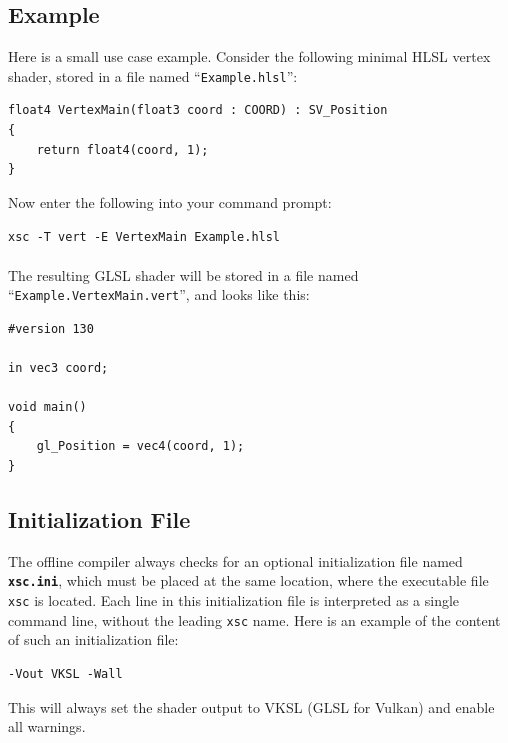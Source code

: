 \documentclass{article}
\begin{document}
\subsection{Example}

Here is a small use case example. Consider the following minimal HLSL vertex shader,
stored in a file named ``\texttt{Example.hlsl}'':
\begin{lstlisting}
float4 VertexMain(float3 coord : COORD) : SV_Position
{
    return float4(coord, 1);
}
\end{lstlisting}
Now enter the following into your command prompt:

\texttt{xsc -T vert -E VertexMain Example.hlsl}
\\ \\
\noindent
The resulting GLSL shader will be stored in a file named ``\texttt{Example.VertexMain.vert}'', and looks like this:
\begin{lstlisting}
#version 130

in vec3 coord;

void main()
{
    gl_Position = vec4(coord, 1);
}
\end{lstlisting}

\subsection{Initialization File}

The offline compiler always checks for an optional initialization file named \textbf{\texttt{xsc.ini}},
which must be placed at the same location, where the executable file \texttt{xsc} is located.
Each line in this initialization file is interpreted as a single command line, without the leading \texttt{xsc} name.
Here is an example of the content of such an initialization file:
\begin{lstlisting}[caption=\texttt{xsc.ini}]
-Vout VKSL -Wall
\end{lstlisting}
This will always set the shader output to VKSL (GLSL for Vulkan) and enable all warnings.



\end{document}
